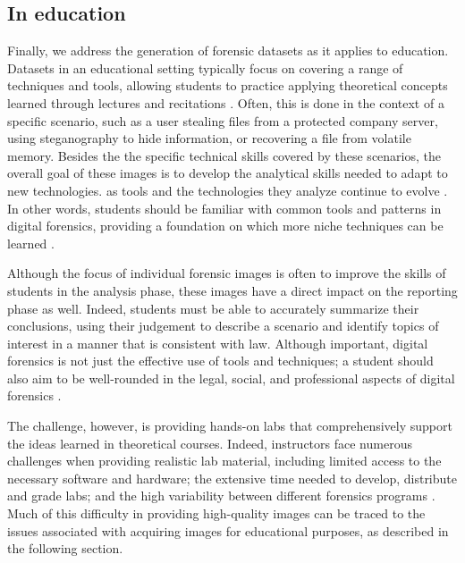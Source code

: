 \documentclass[letterpaper,12pt]{report}
\begin{document}
\subsection{In education}\label{in-education}

Finally, we address the generation of forensic datasets as it applies to
education. Datasets in an educational setting typically focus on
covering a range of techniques and tools, allowing students to practice
applying theoretical concepts learned through lectures and recitations
\cite{adelsteinAutomaticallyCreatingRealistic2005}. Often, this is
done in the context of a specific scenario, such as a user stealing
files from a protected company server, using steganography to hide
information, or recovering a file from volatile memory. Besides the the
specific technical skills covered by these scenarios, the overall goal
of these images is to develop the analytical skills needed to adapt to
new technologies. as tools and the technologies they analyze continue to
evolve \cite{cooperStandardsDigitalForensics2010}. In other words,
students should be familiar with common tools and patterns in digital
forensics, providing a foundation on which more niche techniques can be
learned \cite{lawrenceFrameworkDesignWebbased2009}.

Although the focus of individual forensic images is often to improve the
skills of students in the analysis phase, these images have a direct
impact on the reporting phase as well. Indeed, students must be able to
accurately summarize their conclusions, using their judgement to
describe a scenario and identify topics of interest in a manner that is
consistent with law. Although important, digital forensics is not just
the effective use of tools and techniques; a student should also aim to
be well-rounded in the legal, social, and professional aspects of
digital forensics \cite{andersonComparativeStudyTeaching2006}.

The challenge, however, is providing hands-on labs that comprehensively
support the ideas learned in theoretical courses. Indeed, instructors
face numerous challenges when providing realistic lab material,
including limited access to the necessary software and hardware; the
extensive time needed to develop, distribute and grade labs; and the
high variability between different forensics programs
\cite{adelsteinAutomaticallyCreatingRealistic2005,guptaDigitalForensicsLab2022,lawrenceFrameworkDesignWebbased2009}.
Much of this difficulty in providing high-quality images can be traced
to the issues associated with acquiring images for educational purposes,
as described in the following section.
\end{document}
